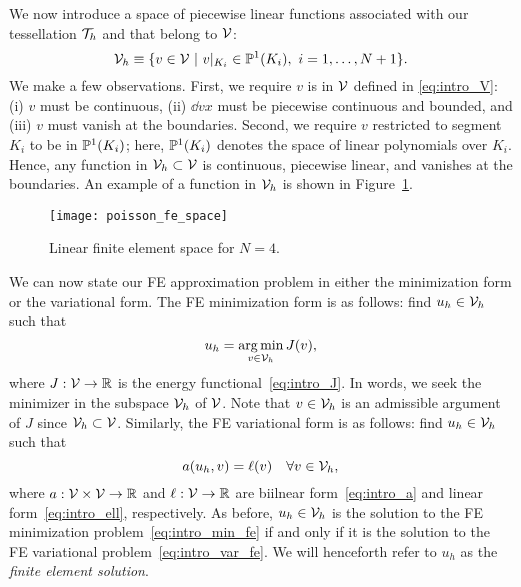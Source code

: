 We now introduce a space of piecewise linear functions associated with our tessellation $\mathcal{T}_h$ and that belong to $\mathcal{V}$:
\begin{equation}
  \mathcal{V}_h \equiv \{ v \in \mathcal{V} \ | \ v|_{K_i} \in \mathbb{P}^1(K_i), \ i = 1,\dots,N+1\}.
  \label{eq:intro_Vh}
\end{equation}
We make a few observations.  First, we require $v$ is in $\mathcal{V}$ defined in \eqref{eq:intro_V}: (i) $v$ must be continuous, (ii) $\dd{v}{x}$ must be piecewise continuous and bounded, and (iii) $v$ must vanish at the boundaries.  Second, we require $v$ restricted to segment $K_i$ to be in $\mathbb{P}^1(K_i)$; here, $\mathbb{P}^1(K_i)$ denotes the space of linear polynomials over $K_i$.  Hence, any function in $\mathcal{V}_h \subset \mathcal{V}$ is continuous, piecewise linear, and vanishes at the boundaries. An example of a function in $\mathcal{V}_h$ is shown in Figure~\ref{fig:poisson_fe_space}.

\begin{figure}
  \centering
  \texttt{[image: poisson\_fe\_space]}
  \caption{Linear finite element space for $N = 4$.}
  \label{fig:poisson_fe_space}
\end{figure}

We can now state our FE approximation problem in either the minimization form or the variational form.  The FE minimization form is as follows: find $u_h \in \mathcal{V}_h$ such that
\begin{equation}
  u_h = \operatorname*{arg\,min}_{v \in \mathcal{V}_h} J(v),
  \label{eq:intro_min_fe}
\end{equation}
where $J: \mathcal{V} \to \mathbb{R}$ is the energy functional~\eqref{eq:intro_J}. In words, we seek the minimizer in the subspace $\mathcal{V}_h$ of $\mathcal{V}$.  Note that $v \in \mathcal{V}_h$ is an admissible argument of $J$ since $\mathcal{V}_h \subset \mathcal{V}$. Similarly, the FE variational form is as follows: find $u_h \in \mathcal{V}_h$ such that
\begin{equation}
  a(u_h,v) = \ell(v) \quad \forall v \in \mathcal{V}_h,
  \label{eq:intro_var_fe}
\end{equation}
where $a: \mathcal{V} \times \mathcal{V} \to \mathbb{R}$ and $\ell: \mathcal{V} \to \mathbb{R}$ are biilnear form~\eqref{eq:intro_a} and linear form~\eqref{eq:intro_ell}, respectively.  As before, $u_h \in \mathcal{V}_h$ is the solution to the FE minimization problem~\eqref{eq:intro_min_fe} if and only if it is the solution to the FE variational problem~\eqref{eq:intro_var_fe}. We will henceforth refer to $u_h$ as the \emph{finite element solution}.



